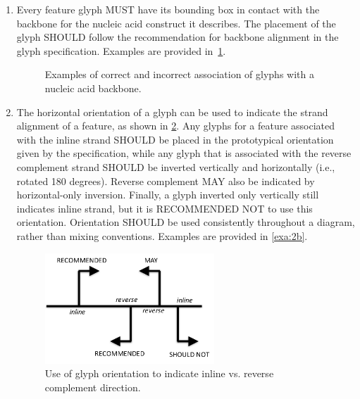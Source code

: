 \begin{enumerate}
\item Every feature glyph MUST have its bounding box in contact with the backbone for the nucleic acid construct it describes. 
The placement of the glyph SHOULD follow the recommendation for backbone alignment in the glyph specification.
	Examples are provided in~\ref{exa:2a}.
   	\begin{figure}[h!]
	\centering
	\caption{Examples of correct and incorrect association of glyphs with a nucleic acid backbone.}
	\label{exa:2a}
	\end{figure}

\item The horizontal orientation of a glyph can be used to indicate the strand alignment of a feature, as shown in \ref{f:orientation}. 
	Any glyphs for a feature associated with the inline strand SHOULD be placed in the prototypical orientation given by the specification,
	while any glyph that is associated with the reverse complement strand SHOULD be inverted vertically and horizontally (i.e., rotated 180 degrees). 
	Reverse complement MAY also be indicated by horizontal-only inversion.
	Finally, a glyph inverted only vertically still indicates inline strand, but it is RECOMMENDED NOT to use this orientation.
	Orientation SHOULD be used consistently throughout a diagram, rather than mixing conventions.
	Examples are provided in \ref{exa:2b}.
	
	\begin{figure}[h!]
	\centering
	\includegraphics[width=2.5in]{figures/orientation.pdf}
	\caption{Use of glyph orientation to indicate inline vs. reverse complement direction.}
	\label{f:orientation}
	\end{figure} 
	

\end{enumerate}
